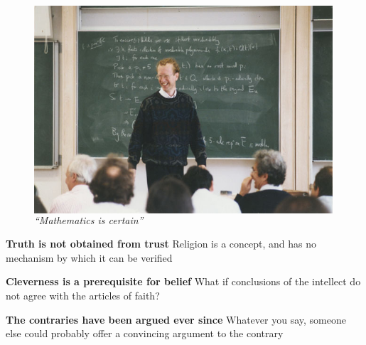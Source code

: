 \documentclass[xcolor=dvipsnames]{beamer}
\begin{document}
\begin{frame}[plain]
\begin{figure}
  \centering
  \begin{columns}
    \centering
    \includegraphics[width=0.99\textwidth,trim=0 0 0 0, clip]{fermats-theorem}
    \caption {\emph{``Mathematics is certain''}}
  \end{columns}
\end{figure}
\end{frame}


\begin{frame}[plain]
\textbf{Truth is not obtained from trust}\newline
Religion is a concept, and has no mechanism by which it can be verified \vspace{10mm}

\textbf{Cleverness is a prerequisite for belief}\newline
What if conclusions of the intellect do not agree with the articles of faith? \vspace{10mm}

\textbf{The contraries have been argued ever since}\newline
Whatever you say, someone else could probably offer a convincing argument to the contrary \vspace{10mm}
\end{frame}
\end{document}

